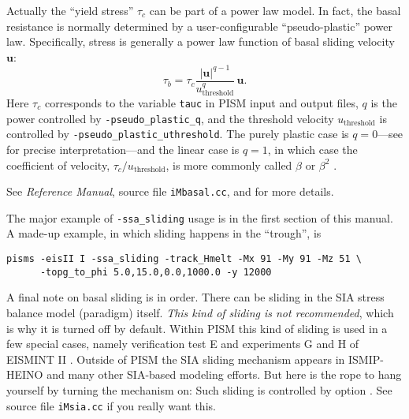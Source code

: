 Actually the ``yield stress'' $\tau_c$ can be part of a power law model.  In fact, the basal resistance is normally determined by a user-configurable ``pseudo-plastic'' power law.  Specifically, stress is generally a power law function of basal sliding velocity $\mathbf{u}$:
   $$\tau_b = \tau_c \frac{|\mathbf{u}|^{q-1}}{u_{\text{threshold}}^q}\, \mathbf{u}.$$
Here $\tau_c$ corresponds to the variable \texttt{tauc} in PISM input and output files, $q$ is the power controlled by \texttt{-pseudo_plastic_q}, and the threshold velocity $u_{\text{threshold}}$ is controlled by \texttt{-pseudo_plastic_uthreshold}.  The purely plastic case is $q=0$---see \cite{SchoofStream} for precise interpretation---and the linear case is $q=1$, in which case the coefficient of velocity, $\tau_c/u_{\text{threshold}}$, is more commonly called $\beta$ or $\beta^2$ \cite{MacAyeal}.

See \emph{Reference Manual}, source file \texttt{iMbasal.cc}, and \cite{BBssasliding,BKAJS} for more details.

The major example of \texttt{-ssa_sliding} usage is in the first section of this manual.  A made-up example, in which sliding happens in the ``trough'', is
\begin{verbatim}
pisms -eisII I -ssa_sliding -track_Hmelt -Mx 91 -My 91 -Mz 51 \
      -topg_to_phi 5.0,15.0,0.0,1000.0 -y 12000
\end{verbatim}

A final note on basal sliding is in order.  There can be sliding in the SIA stress balance model (paradigm) itself.  \emph{This kind of sliding is not recommended}, which is why it is turned off by default.  Within PISM this kind of sliding is used in a few special cases, namely verification test E and experiments G and H of EISMINT II \cite{EISMINT00}.  Outside of PISM the SIA sliding mechanism appears in ISMIP-HEINO \cite{Calovetal2009HEINOfinal} and many other SIA-based modeling efforts.  But here is the rope to hang yourself by turning the mechanism on:  Such sliding is controlled by option .  See source file \texttt{iMsia.cc} if you really want this.

